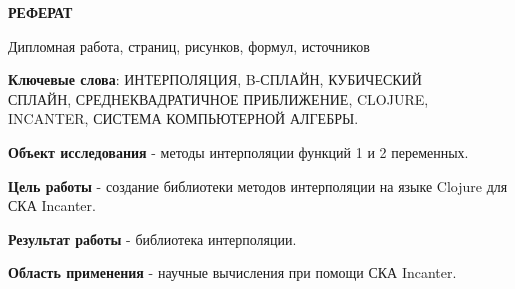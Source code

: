 \begin{center}\textbf{РЕФЕРАТ}\end{center}

Дипломная работа,  страниц,  рисунков,  формул,  источников

\vspace{1cm}

\textbf{Ключевые слова}: ИНТЕРПОЛЯЦИЯ, B-СПЛАЙН, КУБИЧЕСКИЙ \\СПЛАЙН, СРЕДНЕКВАДРАТИЧНОЕ ПРИБЛИЖЕНИЕ, CLOJURE, \\INCANTER, СИСТЕМА КОМПЬЮТЕРНОЙ АЛГЕБРЫ.

\vspace{1cm}

\textbf{Объект исследования} - методы интерполяции функций 1 и 2 переменных.

\textbf{Цель работы} - создание библиотеки методов интерполяции на языке Clojure для СКА Incanter.

\textbf{Результат работы} - библиотека интерполяции.

\textbf{Область применения} - научные вычисления при помощи СКА Incanter.



